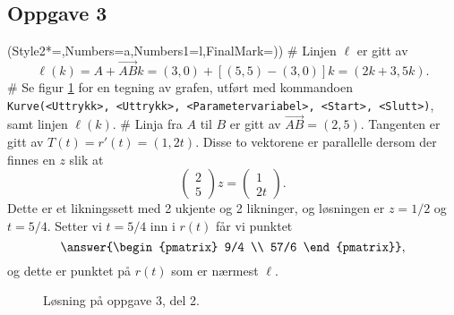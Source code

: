 \subsection*{Oppgave 3}
\begin{easylist}[enumerate]
	\ListProperties(Style2*=,Numbers=a,Numbers1=l,FinalMark={)})
	# Linjen $\ell$ er gitt av
	\begin{equation*}
	\ell(k) = A + \vec{AB} k = (3, 0) + \left[ (5, 5) - (3, 0) \right] k = (2k+3, 5k).
	\end{equation*}
	# Se figur \ref{fig:del2_oppg3} for en tegning av grafen, utført med kommandoen \\
	\verb|Kurve(<Uttrykk>, <Uttrykk>, <Parametervariabel>, <Start>, <Slutt>)|,\\
	samt linjen $\ell(k)$.
	# Linja fra $A$ til $B$ er gitt av $\vec{AB} = (2, 5)$.
	Tangenten er gitt av $T(t) = r'(t) = (1, 2t)$.
	Disse to vektorene er parallelle dersom der finnes en $z$ slik at
	\begin{equation*}
	\begin{pmatrix}
	2 \\
	5
	\end{pmatrix} z =
	\begin{pmatrix}
	1 \\
	2t
	\end{pmatrix}.
	\end{equation*}
	Dette er et likningssett med 2 ukjente og 2 likninger, og løsningen er $z = 1/2$ og $t = 5/4$.
	Setter vi $t = 5/4$ inn i $r(t)$ får vi punktet 
	\begin{equation*}
	\answer{\begin{pmatrix}
		9/4 \\
		57/6
		\end{pmatrix}},
	\end{equation*}
	og dette er punktet på $r(t)$ som er nærmest $\ell$.
\end{easylist}

\begin{figure}[ht!]
	\centering
	\caption{Løsning på oppgave 3, del 2.}
	\label{fig:del2_oppg3}
\end{figure}

